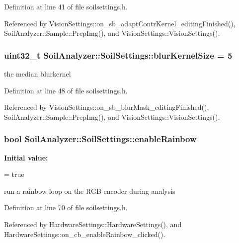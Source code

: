 Definition at line 41 of file soilsettings.\+h.



Referenced by Vision\+Settings\+::on\+\_\+sb\+\_\+adapt\+Contr\+Kernel\+\_\+editing\+Finished(), Soil\+Analyzer\+::\+Sample\+::\+Prep\+Img(), and Vision\+Settings\+::\+Vision\+Settings().

\hypertarget{class_soil_analyzer_1_1_soil_settings_afa46542d30045e00fadbdd5a6ab9a1e1}{}
\subsubsection[{blur\+Kernel\+Size}]{\setlength{\rightskip}{0pt plus 5cm}uint32\+\_\+t Soil\+Analyzer\+::\+Soil\+Settings\+::blur\+Kernel\+Size = 5}\label{class_soil_analyzer_1_1_soil_settings_afa46542d30045e00fadbdd5a6ab9a1e1}
the median blurkernel 

Definition at line 48 of file soilsettings.\+h.



Referenced by Vision\+Settings\+::on\+\_\+sb\+\_\+blur\+Mask\+\_\+editing\+Finished(), Soil\+Analyzer\+::\+Sample\+::\+Prep\+Img(), and Vision\+Settings\+::\+Vision\+Settings().

\hypertarget{class_soil_analyzer_1_1_soil_settings_a9ece0b96eb8614a497fba3a19d8b4da1}{}
\subsubsection[{enable\+Rainbow}]{\setlength{\rightskip}{0pt plus 5cm}bool Soil\+Analyzer\+::\+Soil\+Settings\+::enable\+Rainbow}\label{class_soil_analyzer_1_1_soil_settings_a9ece0b96eb8614a497fba3a19d8b4da1}
{\bfseries Initial value\+:}
\begin{DoxyCode}
=
      \textcolor{keyword}{true}
\end{DoxyCode}
run a rainbow loop on the R\+G\+B encoder during analysis 

Definition at line 70 of file soilsettings.\+h.



Referenced by Hardware\+Settings\+::\+Hardware\+Settings(), and Hardware\+Settings\+::on\+\_\+cb\+\_\+enable\+Rainbow\+\_\+clicked().

